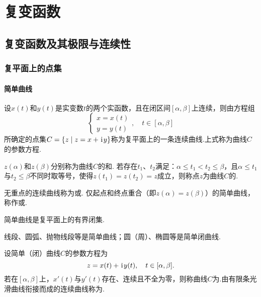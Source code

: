 \chapter{复变函数}
\section{复变函数及其极限与连续性}
\subsection{复平面上的点集}
\subsubsection{简单曲线}
\begin{definition}
设\(x(t)\)和\(y(t)\)是实变数\(t\)的两个实函数，且在闭区间\([\alpha,\beta]\)上连续，则由方程组\[
\left\{ \begin{array}{l}
x = x(t) \\
y = y(t)
\end{array} \right., \quad t \in [\alpha,\beta]
\]所确定的点集\(C = \{ z \mid z = x + \kern1pt\mathrm{i}\kern1pt y \}\)称为复平面上的一条连续曲线.上式称为曲线\(C\)的参数方程.

\(z(\alpha)\)和\(z(\beta)\)分别称为曲线\(C\)的和.
若存在\(t_1\)、\(t_2\)满足：\(\alpha \leqslant t_1 < t_2 \leqslant \beta\)，且\(\alpha \leqslant t_1\)与\(t_2 \leqslant \beta\)不同时取等号，使得\(z(t_1) = z(t_2) = z\)成立，则称点\(z\)为曲线\(C\)的.

无重点的连续曲线称为或.
仅起点和终点重合（即\(z(\alpha)=z(\beta)\)）的简单曲线，称作或.
\end{definition}

\begin{property}
简单曲线是复平面上的有界闭集.
\end{property}

\begin{example}
线段、圆弧、抛物线段等是简单曲线；圆（周）、椭圆等是简单闭曲线.
\end{example}

\begin{definition}
设简单（闭）曲线\(C\)的参数方程为\[
z = x(t) + \kern1pt\mathrm{i}\kern1pt y(t), \quad t \in [\alpha,\beta].
\]若在\([\alpha,\beta]\)上，\(x'(t)\)与\(y'(t)\)存在、连续且不全为零，则称曲线\(C\)为.由有限条光滑曲线衔接而成的连续曲线称为.
\end{definition}

